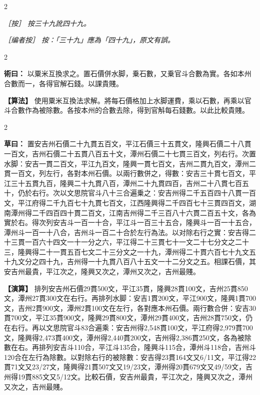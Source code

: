 \documentclass[11pt,a4paper]{article}
\newcommand{\ClassicalMethod}[1]{\par\noindent\textbf{\color{methodcolor}術曰：}#1\par}
\newcommand{\ClassicalWorking}[1]{\par\noindent\textbf{草曰：}#1\par}
\newcommand{\ClassicalNote}[1]{\par\noindent\textit{［按］#1}\par}
\newcommand{\ModernMethod}[1]{\par\noindent\textbf{\color{methodcolor}【算法】}#1\par}
\newcommand{\ModernWorking}[1]{\par\noindent\textbf{【演算】}#1\par}
\newcommand{\ModernNote}[1]{\par\noindent\textit{\color{notecolor}［编者按］#1}\par}
\begin{document}
\begin{paracol}{2}

\ClassicalNote{%
按三十九訛四十九。}

\switchcolumn

\ModernNote{%
按：「三十九」應為「四十九」，原文有誤。
}

\end{paracol}

\begin{paracol}{2}

\ClassicalMethod{%
以粟米互換求之。置石價併水脚，乗石數，又乗官斗合數為實。各如本州合數而一，各得官解石錢。以課貴賤。}

\switchcolumn

\ModernMethod{%
使用粟米互換法求解。將每石價格加上水脚運費，乘以石數，再乘以官斗合數作為被除數。各按本州的合數去除，得到官斛每石錢數。以此比較貴賤。
}

\end{paracol}

\begin{paracol}{2}

\ClassicalWorking{%
置安吉州石價二十九貫五百文，平江石價三十五貫文，隆興石價二十八貫一百文，吉州石價二十五貫八百五十文，潭州石價二十七貫三百文，列右行。次置水脚：安吉一貫二百文，平江九百文，隆興一貫七百文，吉州二貫九百文，潭州二貫一百文，列左行，各對本州石價。以兩行數併之，得數：安吉三十貫七百文，平江三十五貫九百，隆興二十九貫八百，潭州二十九貫四百，吉州二十八貫七百五十，仍於右行。次以文思院官斗八十三合遍乗之：安吉州得二千五百四十八貫一百文，平江府得二千九百七十九貫七百文，江西隆興得二千四百七十三貫四百文，湖南潭州得二千四百四十貫二百文，江南吉州得二千三百八十六貫二百五十文，各為實於右。得次列安吉斗一百一十合，平江斗一百三十五合，隆興斗一百一十五合，潭州斗一百一十八合，吉州斗一百二十合於左行為法。以对除右行之實：安吉得二十三貫一百六十四文一十一分之六，平江得二十三貫七十一文二十七分文之二十三，隆興得二十一貫五百七文二十三分文之一十九，潭州得二十貫六百七十九文五十九文分之四十九，吉州得一十九貫八百八十五文一十二分文之五。相課石價，其安吉州最貴，平江次之，隆興又次之，潭州又次之，吉州最賤。}

\switchcolumn

\ModernWorking{%
排列安吉州石價29貫500文，平江35貫，隆興28貫100文，吉州25貫850文，潭州27貫300文在右行。再排列水脚：安吉1貫200文，平江900文，隆興1貫700文，吉州2貫900文，潭州2貫100文在左行，各對應本州石價。兩行數合併：安吉30貫700文，平江35貫900文，隆興29貫800文，潭州29貫400文，吉州28貫750文，仍在右行。再以文思院官斗83合遍乘：安吉州得2,548貫100文，平江府得2,979貫700文，隆興得2,473貫400文，潭州得2,440貫200文，吉州得2,386貫250文，各為被除數在右。再排列安吉斗110合，平江斗135合，隆興斗115合，潭州斗118合，吉州斗120合在左行為除數。以對除右行的被除數：安吉得23貫164文又6/11文，平江得22貫71文又23/27文，隆興得21貫507文又19/23文，潭州得20貫679文又49/59文，吉州得19貫885文又5/12文。比較石價，安吉州最貴，平江次之，隆興又次之，潭州又次之，吉州最賤。
}

\end{paracol}
\end{document}
